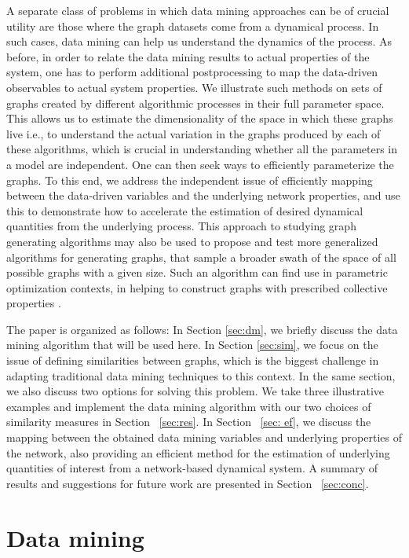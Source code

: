 A separate class of problems in which data mining approaches can be of
crucial utility are those where the graph datasets come from a
dynamical process. In such cases, data mining can help us understand
the dynamics of the process. As before, in order to relate the data
mining results to actual properties of the system, one has to perform
additional postprocessing to map the data-driven observables to actual
system properties.
% 
We illustrate such methods on sets of graphs created by different
algorithmic processes in their full parameter space. This allows us to
estimate the dimensionality of the space in which these graphs live
i.e., to understand the actual variation in the graphs produced by
each of these algorithms, which is crucial in understanding whether
all the parameters in a model are independent.
% 
One can then seek ways to efficiently parameterize the graphs. To this
end, we address the independent issue of efficiently mapping between
the data-driven variables and the underlying network properties, and
use this to demonstrate how to accelerate the estimation of desired
dynamical quantities from the underlying process. This approach to
studying graph generating algorithms may also be used to propose and
test more generalized algorithms for generating graphs, that sample a
broader swath of the space of all possible graphs with a given
size. Such an algorithm can find use in parametric optimization
contexts, in helping to construct graphs with prescribed collective
properties \cite{gounaris_generation_2011}.

The paper is organized as follows: In Section \ref{sec:dm}, we briefly
discuss the data mining algorithm that will be used here. In Section
\ref{sec:sim}, we focus on the issue of defining similarities between
graphs, which is the biggest challenge in adapting traditional data
mining techniques to this context. In the same section, we also
discuss two options for solving this problem. We take three
illustrative examples and implement the data mining algorithm with our
two choices of similarity measures in Section ~\ref{sec:res}. In
Section ~\ref{sec: ef}, we discuss the mapping between the obtained
data mining variables and underlying properties of the network, also
providing an efficient method for the estimation of underlying
quantities of interest from a network-based dynamical system. A
summary of results and suggestions for future work are presented in
Section ~\ref{sec:conc}.

\section{\label{sec:dm}Data mining}

